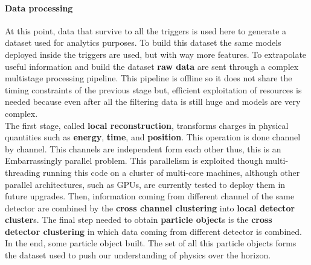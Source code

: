 \paragraph{Data processing} 
At this point, data that survive to all the triggers is used here to generate a dataset used for analytics purposes. To build this dataset the same models deployed inside the triggers are used, but with way more features. To extrapolate useful information and build the dataset \textbf{raw data} are sent through a complex multistage processing pipeline. This pipeline is offline so it does not share the timing constraints of the previous stage but, efficient exploitation of resources is needed because even after all the filtering data is still huge and models are very complex. \\
The first stage, called \textbf{local reconstruction}, transforms charges in physical quantities such as \textbf{energy}, \textbf{time}, and \textbf{position}. This operation is done channel by channel. This channels are independent form each other thus, this is an Embarrassingly parallel problem. This parallelism is exploited though multi-threading running this code on a cluster of multi-core machines, although other parallel architectures, such as GPUs, are currently tested to deploy them in future upgrades. Then, information coming from different channel of the same detector are combined by the \textbf{cross channel clustering} into \textbf{local detector cluster}s. The final step needed to obtain \textbf{particle object}s is the \textbf{cross detector clustering} in which data coming from different detector is combined. In the end, some particle object built. The set of all this particle objects forms the dataset used to push our understanding of physics over the horizon.\\
